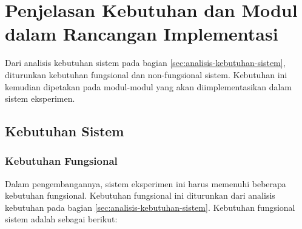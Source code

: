\chapter{Penjelasan Kebutuhan dan Modul dalam Rancangan Implementasi}
\label{appendix:modules}

Dari analisis kebutuhan sistem pada bagian \ref{sec:analisis-kebutuhan-sistem}, diturunkan kebutuhan fungsional dan non-fungsional sistem. Kebutuhan ini kemudian dipetakan pada modul-modul yang akan diimplementasikan dalam sistem eksperimen.

\section{Kebutuhan Sistem} 
\label{appendix:system-requirements}
\subsection{Kebutuhan Fungsional}
Dalam pengembangannya, sistem eksperimen ini harus memenuhi beberapa kebutuhan fungsional. Kebutuhan fungsional ini diturunkan dari analisis kebutuhan pada bagian \ref{sec:analisis-kebutuhan-sistem}. Kebutuhan fungsional sistem adalah sebagai berikut:

